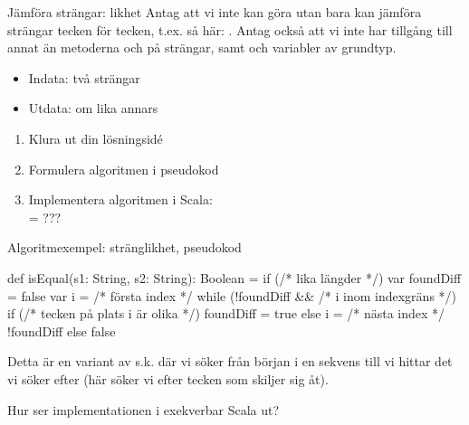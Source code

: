 \begin{Slide}{Jämföra strängar: likhet}\SlideFontSmall
Antag att vi inte kan göra  utan bara kan jämföra strängar tecken för tecken,
t.ex. så här: . Antag också att vi inte har tillgång till annat än metoderna  och  på strängar, samt   och variabler av grundtyp. 

\pause
\begin{itemize}
\item Indata: två strängar
\item Utdata:  om lika annars 
\end{itemize}
\begin{enumerate}
\item Klura ut din lösningsidé
\item Formulera algoritmen i pseudokod
\item Implementera algoritmen i Scala: \\ = ???
\end{enumerate}
\end{Slide}

\begin{Slide}{Algoritmexempel: stränglikhet, pseudokod}
\begin{Code}
def isEqual(s1: String, s2: String): Boolean = {
  if (/* lika längder */) {
    var foundDiff = false
    var i = /* första index */
    while (!foundDiff && /* i inom indexgräns */) {
      if (/* tecken på plats i är olika */) foundDiff = true
      else i = /* nästa index */
    }
    !foundDiff
  } else false
}
\end{Code}

\pause\noindent Detta är en variant av s.k.  där vi söker från början i en sekvens till vi hittar det vi söker efter (här söker vi efter tecken som skiljer sig åt).
\\\pause\vspace{1em}

\noindent Hur ser implementationen i exekverbar Scala ut?
\end{Slide}

